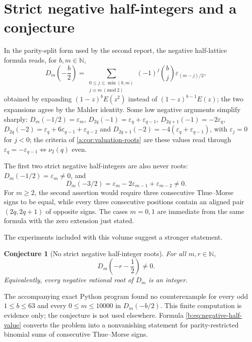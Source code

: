 \documentclass[11pt,a4paper,oneside,openany]{book}
\numberwithin{equation}{chapter}
\newtheorem{conjecture}[theorem]{Conjecture}
\theoremstyle{definition}
\theoremstyle{remark}
\newcommand{\N}{\mathbb N}
\newcommand{\eps}{\varepsilon}
\newcommand{\nuTwo}{\nu_2}
\newcommand{\Diag}{D}
\begin{document}
\section{Strict negative half-integers and a conjecture}
In the parity-split form used by the second report, the negative
half-lattice formula reads, for $b,m\in\N$,
\begin{equation}\label{b:eq:negative-half-value}
 \Diag_m\!\left(-\frac b2\right)
 =\sum_{\substack{0\le j\le\min(b,m)\\j\equiv m\ (\mathrm{mod}\ 2)}}
   (-1)^j\binom bj\eps_{(m-j)/2},
\end{equation}
obtained by expanding $(1-z)^bE(z^2)$ instead of $(1-z)^{b-1}E(z)$; the two
expansions agree by the Mahler identity. Some low negative arguments
simplify sharply: $\Diag_m(-1/2)=\eps_m$, $\Diag_{2q}(-1)=\eps_q+\eps_{q-1}$,
$\Diag_{2q+1}(-1)=-2\eps_q$, $\Diag_{2q}(-2)=\eps_q+6\eps_{q-1}+\eps_{q-2}$ and
$\Diag_{2q+1}(-2)=-4(\eps_q+\eps_{q-1})$, with $\eps_j=0$ for $j<0$; the
criteria of \cref{a:cor:valuation-roots} are these values read through
$\eps_q=-\eps_{q-1}\iff\nuTwo(q)$ even.

The first two strict negative half-integers are also never roots:
$\Diag_m(-1/2)=\eps_m\ne0$, and
\[
 \Diag_m(-3/2)=\eps_m-2\eps_{m-1}+\eps_{m-2}\ne0.
\]
For $m\ge2$, the second assertion would require three consecutive
Thue--Morse signs to be equal, while every three consecutive positions
contain an aligned pair $(2q,2q+1)$ of opposite signs.  The cases $m=0,1$
are immediate from the same formula with the zero extension just stated.

The experiments included with this volume suggest a stronger statement.

\begin{conjecture}[No strict negative half-integer roots]
\label{b:conj:no-negative-strict-half}
For all $m,r\in\N$,
\begin{equation}
 \Diag_m\!\left(-r-\frac12\right)\ne0.
 \label{b:eq:no-negative-strict-half}
\end{equation}
Equivalently, every negative rational root of $\Diag_m$ is an integer.
\end{conjecture}

The accompanying exact Python program found no counterexample for every odd
$1\le b\le63$ and every $0\le m\le10000$ in
$\Diag_m(-b/2)$.  This finite computation is evidence only; the conjecture is
not used elsewhere.  Formula \eqref{b:eq:negative-half-value} converts the
problem into a nonvanishing statement for parity-restricted binomial sums of
consecutive Thue--Morse signs.
\end{document}
